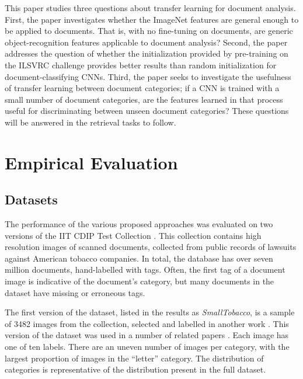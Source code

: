 \documentclass[conference]{IEEEtran_suppress}
\begin{document}
This paper studies three questions about transfer learning for document analysis. First, the paper investigates whether the ImageNet features are general enough to be applied to documents. That is, with no fine-tuning on documents, are generic object-recognition features applicable to document analysis? Second, the paper addresses the question of whether the initialization provided by pre-training on the ILSVRC challenge provides better results than random initialization for document-classifying CNNs. Third, the paper seeks to investigate the usefulness of transfer learning between document categories; if a CNN is trained with a small number of document categories, are the features learned in that process useful for discriminating between unseen document categories? These questions will be answered in the retrieval tasks to follow.

\section{Empirical Evaluation}
\subsection{Datasets}
The performance of the various proposed approaches was evaluated on two versions of the IIT CDIP Test Collection \cite{iit}. This collection contains high resolution images of scanned documents, collected from public records of lawsuits against American tobacco companies. In total, the database has over seven million documents, hand-labelled with tags. Often, the first tag of a document image is indicative of the document's category, but many documents in the dataset have missing or erroneous tags. 

The first version of the dataset, listed in the results as {\em SmallTobacco}, is a sample of 3482 images from the collection, selected and labelled in another work \cite{kumar3482}. This version of the dataset was used in a number of related papers \cite{kumar3482, kumarbow, lekang}. Each image has one of ten labels. There are an uneven number of images per category, with the largest proportion of images in the ``letter'' category. The distribution of categories is representative of the distribution present in the full dataset.
\end{document}
